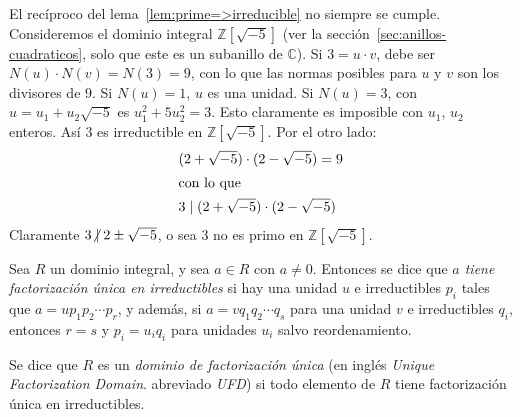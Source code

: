   El recíproco del lema~\ref{lem:prime=>irreducible}
  no siempre se cumple.
  Consideremos el dominio integral
  \(\mathbb{Z}[\sqrt{-5}]\)
  (ver la sección~\ref{sec:anillos-cuadraticos},
   solo que este es un subanillo de \(\mathbb{C}\)).
  Si \(3 = u \cdot v\),
  debe ser \(N(u) \cdot N(v) = N(3) = 9\),
  con lo que las normas posibles para \(u\) y \(v\)
  son los divisores de 9.
  Si \(N(u) = 1\),
  \(u\) es una unidad.
  Si \(N(u) = 3\),
  con \(u = u_1 + u_2 \sqrt{-5}\)
  es \(u_1^2 + 5 u_2^2 = 3\).
  Esto claramente es imposible con \(u_1\), \(u_2\) enteros.
  Así \(3\) es irreductible en \(\mathbb{Z}[\sqrt{-5}]\).
  Por el otro lado:
  \begin{align*}
    &(2 + \sqrt{-5}) \cdot (2 - \sqrt{-5})
      = 9 \\
  \intertext{con lo que}
    &3
      \mid (2 + \sqrt{-5}) \cdot (2 - \sqrt{-5})
  \end{align*}
  Claramente \(3 \centernot\mid 2 \pm \sqrt{-5}\),
  o sea 3 no es primo en \(\mathbb{Z}[\sqrt{-5}]\).

  \begin{definition}
    Sea \(R\) un dominio integral,
    y sea \(a \in R\) con \(a \ne 0\).
    Entonces se dice
    que \emph{\(a\) tiene factorización única en irreductibles}
    si hay una unidad \(u\)
    e irreductibles \(p_i\) tales que \(a = u p_1 p_2 \dotsm p_r\),
    y además,
    si \(a = v q_1 q_2 \dotsm q_s\) para una unidad \(v\)
    e irreductibles \(q_i\),
    entonces \(r = s\)
    y \(p_i = u_i q_i\)
    para unidades \(u_i\) salvo reordenamiento.
  \end{definition}
  \begin{definition}
    Se dice que \(R\) es un \emph{dominio de factorización única}
    (en inglés
     \emph{\foreignlanguage{english}{Unique Factorization Domain}}.
     abreviado \emph{UFD})
    si todo elemento de \(R\)
    tiene factorización única en irreductibles.
  \end{definition}

